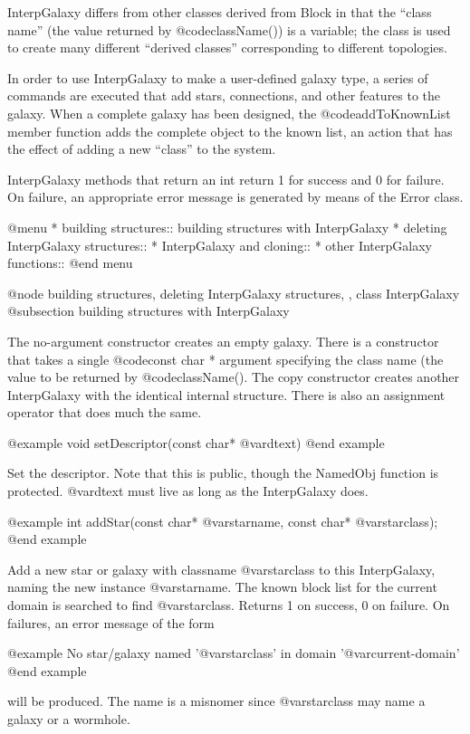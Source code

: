 InterpGalaxy differs from other classes derived from Block in that
the ``class name'' (the value returned by @code{className()}) is a
variable; the class is used to create many different ``derived classes''
corresponding to different topologies.

In order to use InterpGalaxy to make a user-defined galaxy type,
a series of commands are executed that add stars, connections, and
other features to the galaxy.  When a complete galaxy has been
designed, the @code{addToKnownList} member function adds the complete
object to the known list, an action that has the effect of adding a
new ``class'' to the system.

InterpGalaxy methods that return an int return 1 for success and 0
for failure.  On failure, an appropriate error message is generated
by means of the Error class.


@menu
* building structures::  building structures with InterpGalaxy
* deleting InterpGalaxy structures::  
* InterpGalaxy and cloning::  
* other InterpGalaxy functions::  
@end menu

@node building structures, deleting InterpGalaxy structures,  , class InterpGalaxy
@subsection building structures with InterpGalaxy

The no-argument constructor creates an empty galaxy.  There is a
constructor that takes a single @code{const char *} argument
specifying the class name (the value to be returned by @code{className()}.
The copy constructor creates another InterpGalaxy with the identical
internal structure.  There is also an assignment operator that does
much the same.

@example
void setDescriptor(const char* @var{dtext})
@end example

Set the descriptor.  Note that this is public, though the NamedObj
function is protected. @var{dtext} must live as long as the InterpGalaxy
does.

@example
int addStar(const char* @var{starname}, const char* @var{starclass});
@end example

Add a new star or galaxy with classname @var{starclass} to this
InterpGalaxy, naming the new instance @var{starname}.  The known block
list for the current domain is searched to find @var{starclass}.
Returns 1 on success, 0 on failure.  On failures, an error message
of the form

@example
No star/galaxy named '@var{starclass}' in domain '@var{current-domain}'
@end example

will be produced.  The name is a misnomer since @var{starclass} may
name a galaxy or a wormhole.

